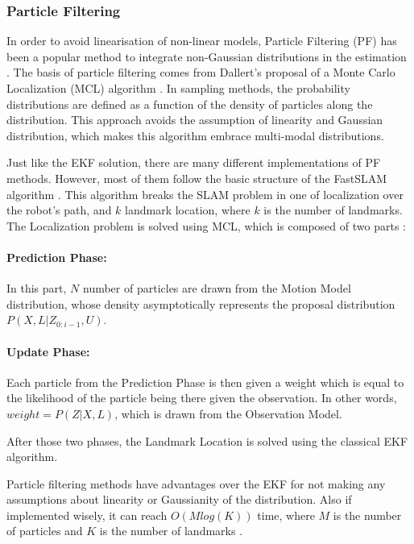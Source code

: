 \documentclass[12pt]{article}
\begin{document}
	\subsubsection{Particle Filtering}

In order to avoid linearisation of non-linear models, Particle Filtering (PF) has been a popular method to integrate non-Gaussian distributions in the estimation \cite{Montemerlo02fastslam:a}\cite{772544}. The basis of particle filtering comes from Dallert's proposal of a Monte Carlo Localization (MCL) algorithm \cite{772544}. In sampling methods, the probability distributions are defined as a function of the density of particles along the distribution. This approach avoids the assumption of linearity and Gaussian distribution, which makes this algorithm embrace multi-modal distributions.
	
Just like the EKF solution, there are many different implementations of PF methods. However, most of them follow the basic structure of the FastSLAM algorithm \cite{Montemerlo02fastslam:a}. This algorithm breaks the SLAM problem in one of localization over the robot's path, and $k$ landmark location, where $k$ is the number of landmarks. The Localization problem is solved using MCL, which is composed of two parts \cite{772544}:
	 
\paragraph{Prediction Phase:} In this part, $N$ number of particles are drawn from the Motion Model distribution, whose density asymptotically represents the proposal distribution $P(X, L | Z_{0:i-1}, U)$.
	 
\paragraph{Update Phase:} Each particle from the Prediction Phase is then given a weight which is equal to the likelihood of the particle being there given the observation. In other words, $weight = P(Z|X, L)$, which is drawn from the Observation Model.
	 
After those two phases, the Landmark Location is solved using the classical EKF algorithm.
	 
Particle filtering methods have advantages over the EKF for not making any assumptions about linearity or Gaussianity of the distribution. Also if implemented wisely, it can reach $O(Mlog(K))$ time, where $M$ is the number of particles and $K$ is the number of landmarks \cite{Montemerlo02fastslam:a}.
	 
\end{document}

